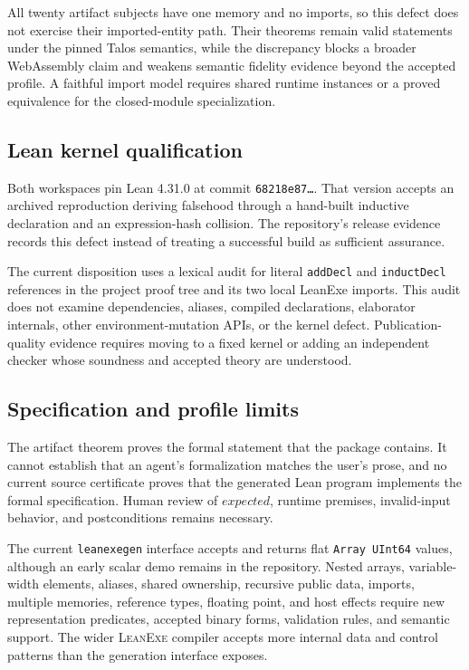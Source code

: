 \documentclass[11pt]{article}
\newcommand{\leanexe}{\textsc{LeanExe}}
\newcommand{\leanexegen}{\texttt{leanexegen}}
\newcommand{\code}[1]{\texttt{#1}}
\begin{document}
All twenty artifact subjects have one memory and no imports, so this defect does not exercise their imported-entity path.  Their theorems remain valid statements under the pinned Talos semantics, while the discrepancy blocks a broader WebAssembly claim and weakens semantic fidelity evidence beyond the accepted profile.  A faithful import model requires shared runtime instances or a proved equivalence for the closed-module specialization.

\subsection{Lean kernel qualification}

Both workspaces pin Lean 4.31.0 at commit \code{68218e87\ldots}.  That version accepts an archived reproduction deriving falsehood through a hand-built inductive declaration and an expression-hash collision.  The repository's release evidence records this defect instead of treating a successful build as sufficient assurance.

The current disposition uses a lexical audit for literal \code{addDecl} and \code{inductDecl} references in the project proof tree and its two local LeanExe imports.  This audit does not examine dependencies, aliases, compiled declarations, elaborator internals, other environment-mutation APIs, or the kernel defect.  Publication-quality evidence requires moving to a fixed kernel or adding an independent checker whose soundness and accepted theory are understood.

\subsection{Specification and profile limits}

The artifact theorem proves the formal statement that the package contains.  It cannot establish that an agent's formalization matches the user's prose, and no current source certificate proves that the generated Lean program implements the formal specification.  Human review of $\mathit{expected}$, runtime premises, invalid-input behavior, and postconditions remains necessary.

The current \leanexegen{} interface accepts and returns flat \code{Array UInt64} values, although an early scalar demo remains in the repository.  Nested arrays, variable-width elements, aliases, shared ownership, recursive public data, imports, multiple memories, reference types, floating point, and host effects require new representation predicates, accepted binary forms, validation rules, and semantic support.  The wider \leanexe{} compiler accepts more internal data and control patterns than the generation interface exposes.
\end{document}
